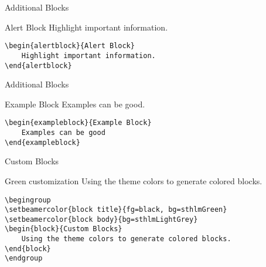 \documentclass[compress,PxFont]{beamer}
\begin{document}

\begin{frame}[containsverbatim]{Additional Blocks}
\begin{alertblock}{Alert Block}
	Highlight important information.
\end{alertblock}
\begin{verbatim}
\begin{alertblock}{Alert Block}
    Highlight important information.
\end{alertblock}
\end{verbatim}

\end{frame}


\begin{frame}[containsverbatim]{Additional Blocks}

\begin{exampleblock}{Example Block}
	Examples can be good.
\end{exampleblock}
\begin{verbatim}
\begin{exampleblock}{Example Block}
    Examples can be good
\end{exampleblock}
\end{verbatim}
\end{frame}


\begin{frame}[containsverbatim]{Custom Blocks}
\begingroup
{}
\begin{block}{Green customization}
	Using the theme colors to generate colored blocks.
\end{block}
\endgroup
\begin{verbatim}
\begingroup
\setbeamercolor{block title}{fg=black, bg=sthlmGreen}
\setbeamercolor{block body}{bg=sthlmLightGrey}
\begin{block}{Custom Blocks}
    Using the theme colors to generate colored blocks.
\end{block}
\endgroup
\end{verbatim}
\end{frame}
\end{document}
